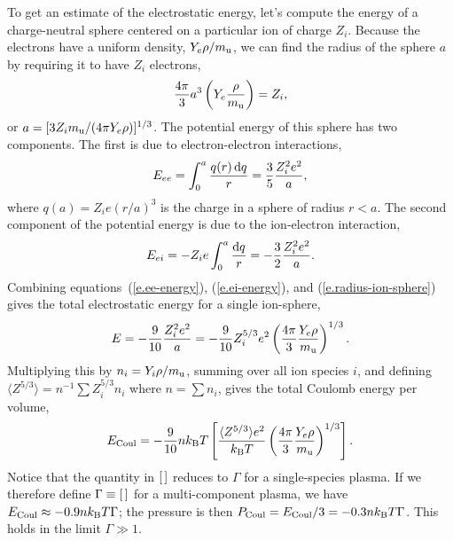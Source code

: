 To get an estimate of the electrostatic energy, let's compute the energy of a charge-neutral sphere centered on a particular ion of charge $Z_{i}$.  Because the electrons have a uniform density, $Y_{e}\rho/m_\mathrm{u}$, we can find the radius of the sphere $a$ by requiring it to have $Z_{i}$ electrons,
\begin{equation}\label{e.radius-ion-sphere}
\frac{4\pi}{3}a^{3}\left(Y_{e}\frac{\rho}{m_\mathrm{u}}\right) = Z_{i},
\end{equation}
or $a = [3 Z_{i} m_\mathrm{u}/(4\pi Y_{e}\rho)]^{1/3}$.  The potential energy of this sphere has two components. The first is due to electron-electron interactions,
\begin{equation}\label{e.ee-energy}
E_{ee} = \int_{0}^{a} \frac{q(r)\, \mathrm{d} q}{r} = \frac{3}{5}\frac{Z_{i}^{2}e^{2}}{a},
\end{equation}
where $q(a) = Z_{i}e(r/a)^{3}$ is the charge in a sphere of radius $r < a$. The second component of the potential energy is due to the ion-electron interaction,
\begin{equation}\label{e.ei-energy}
E_{ei} = -Z_{i}e\int_{0}^{a}\frac{\mathrm{d} q}{r} = -\frac{3}{2}\frac{Z_{i}^{2}e^{2}}{a}.
\end{equation}
Combining equations~(\ref{e.ee-energy}), (\ref{e.ei-energy}), and (\ref{e.radius-ion-sphere}) gives the total electrostatic energy for a single ion-sphere,
\begin{equation}\label{e.madelung-sphere}
E = -\frac{9}{10} \frac{Z_{i}^{2}e^{2}}{a} = -\frac{9}{10} Z_{i}^{5/3} e^{2} \left(\frac{4\pi}{3}\frac{Y_{e}\rho}{m_\mathrm{u}}\right)^{1/3}.
\end{equation}
Multiplying this by $n_{i} = Y_{i}\rho/m_\mathrm{u}$, summing over all ion species $i$, and defining $\langle Z^{5/3}\rangle = n^{-1}\sum Z_{i}^{5/3}n_{i}$ where $n = \sum n_{i}$, gives the total Coulomb energy per volume,
\begin{equation}\label{e.madelung-total}
E_{\mathrm{Coul}} = -\frac{9}{10} nk_\mathrm{B} T \left[\frac{\langle Z^{5/3}\rangle e^{2}}{k_\mathrm{B} T}\left(\frac{4\pi}{3}\frac{Y_{e} \rho}{m_\mathrm{u}}\right)^{1/3}\right].
\end{equation}
Notice that the quantity in $[\,]$ reduces to $\Gamma$ for a single-species plasma.  If we therefore define $\Gamma \equiv [\,]$ for a multi-component plasma, we have $E_{\mathrm{Coul}} \approx -0.9 nk_\mathrm{B} T \Gamma$; the pressure is then $P_{\mathrm{Coul}} = E_{\mathrm{Coul}}/3  = -0.3 n k_\mathrm{B} T \Gamma$. This holds in the limit $\Gamma \gg 1$.

